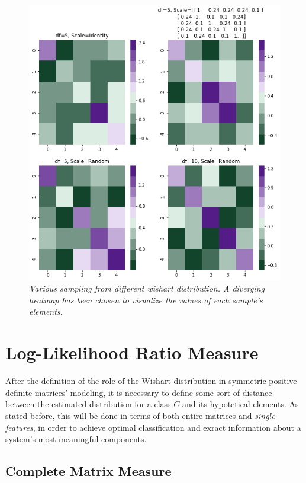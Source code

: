 \documentclass[12pt,openright,twoside,a4paper]{book}
\begin{document}
\clearpage

\begin{figure}[!h]
\centering
\includegraphics[scale=0.5]{randmatr}
\caption{\textit{Various sampling from different wishart distribution. A diverging heatmap has been chosen to visualize the values of each sample's elements.}}
\label{randmatr}
\end{figure}

\section{Log-Likelihood Ratio Measure}

After the definition of the role of the Wishart distribution in symmetric positive definite matrices' modeling, it is necessary to define some sort of distance between the estimated distribution for a class $C$ and its hypotetical elements.
As stated before, this will be done in terms of both entire matrices and \textit{single features}, in order to achieve optimal classification and exract information about a system's most meaningful components.

\subsection{Complete Matrix Measure}
\end{document}
